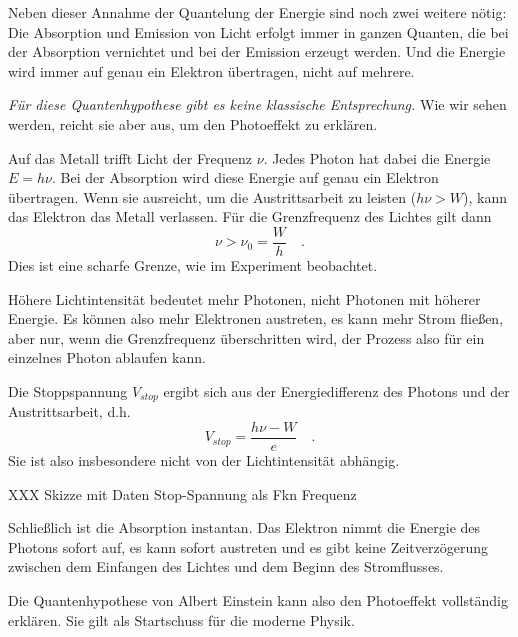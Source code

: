 Neben dieser Annahme der Quantelung der Energie sind noch zwei weitere nötig: Die Absorption und Emission von Licht erfolgt immer in ganzen Quanten, die bei der Absorption vernichtet und bei der Emission erzeugt werden. Und die Energie wird immer auf genau ein Elektron übertragen, nicht auf mehrere.

\emph{Für diese Quantenhypothese gibt es keine klassische Entsprechung.} Wie wir sehen werden, reicht sie aber aus, um den Photoeffekt zu erklären.

Auf das Metall trifft Licht der Frequenz $\nu$. Jedes Photon hat dabei die Energie $E = h \nu$. Bei der Absorption wird diese Energie auf genau ein Elektron übertragen. Wenn sie ausreicht, um die Austrittsarbeit zu leisten ($h \nu > W$), kann das Elektron das Metall verlassen. Für die Grenzfrequenz des Lichtes gilt dann
 \begin{equation}
     \nu > \nu_0 = \frac{W}{h} \quad .
 \end{equation}
 Dies ist eine scharfe Grenze, wie im Experiment beobachtet.

 Höhere Lichtintensität bedeutet mehr Photonen, nicht Photonen mit höherer Energie. Es können also mehr Elektronen austreten, es kann mehr Strom fließen, aber nur, wenn die Grenzfrequenz überschritten wird, der Prozess also für ein einzelnes Photon ablaufen kann.

 Die Stoppspannung $V_{stop}$ ergibt sich aus der Energiedifferenz des Photons und der Austrittsarbeit, d.h. 
 \begin{equation}
     V_{stop} = \frac{h \nu - W}{e} \quad .
 \end{equation}
 Sie ist also insbesondere nicht von der Lichtintensität abhängig.

 \begin{marginfigure}
    \caption{XXX Skizze mit Daten Stop-Spannung als Fkn Frequenz}
\end{marginfigure}


 Schließlich ist die Absorption instantan. Das Elektron nimmt die Energie des Photons sofort auf, es kann sofort austreten und es gibt keine Zeitverzögerung zwischen dem Einfangen des Lichtes und dem Beginn des Stromflusses.

 Die Quantenhypothese von Albert Einstein kann also den Photoeffekt vollständig erklären. Sie gilt als Startschuss für die moderne Physik.

